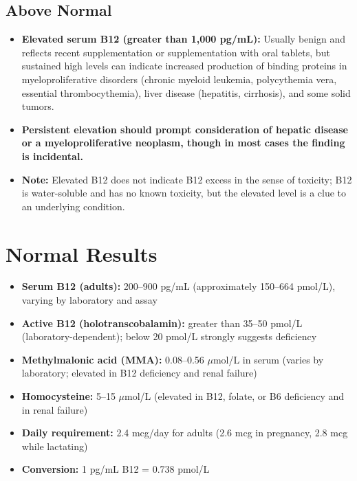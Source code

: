 \subsection*{Above Normal}
\begin{itemize}
  \item \textbf{Elevated serum B12 (greater than 1,000 pg/mL):} Usually benign and reflects recent supplementation or supplementation with oral tablets, but sustained high levels can indicate increased production of binding proteins in myeloproliferative disorders (chronic myeloid leukemia, polycythemia vera, essential thrombocythemia), liver disease (hepatitis, cirrhosis), and some solid tumors.
  \item \textbf{Persistent elevation should prompt consideration of hepatic disease or a myeloproliferative neoplasm, though in most cases the finding is incidental.}
  \item \textbf{Note:} Elevated B12 does not indicate B12 excess in the sense of toxicity; B12 is water-soluble and has no known toxicity, but the elevated level is a clue to an underlying condition.
\end{itemize}

\section*{Normal Results}
\begin{itemize}
  \item \textbf{Serum B12 (adults):} 200--900 pg/mL (approximately 150--664 pmol/L), varying by laboratory and assay
  \item \textbf{Active B12 (holotranscobalamin):} greater than 35--50 pmol/L (laboratory-dependent); below 20 pmol/L strongly suggests deficiency
  \item \textbf{Methylmalonic acid (MMA):} 0.08--0.56 $\mu$mol/L in serum (varies by laboratory; elevated in B12 deficiency and renal failure)
  \item \textbf{Homocysteine:} 5--15 $\mu$mol/L (elevated in B12, folate, or B6 deficiency and in renal failure)
  \item \textbf{Daily requirement:} 2.4 mcg/day for adults (2.6 mcg in pregnancy, 2.8 mcg while lactating)
  \item \textbf{Conversion:} 1 pg/mL B12 = 0.738 pmol/L
\end{itemize}

